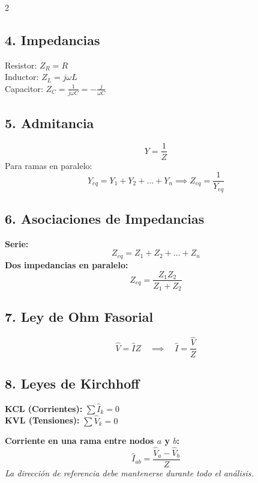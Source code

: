 \documentclass[10pt, a4paper]{article}
\begin{document}
\begin{multicols*}{2}
\subsection*{4. Impedancias}
Resistor: $\boxed{Z_R = R}$ \\
Inductor: $\boxed{Z_L = j\omega L}$ \\
Capacitor: $\boxed{Z_C = \frac{1}{j\omega C} = -\frac{j}{\omega C}}$

\subsection*{5. Admitancia}
\begin{equation*}
    \boxed{Y = \frac{1}{Z}}
\end{equation*}
Para ramas en paralelo:
\begin{equation*}
    Y_{eq} = Y_1 + Y_2 + \dots + Y_n \implies \boxed{Z_{eq} = \frac{1}{Y_{eq}}}
\end{equation*}

\subsection*{6. Asociaciones de Impedancias}
\textbf{Serie:}
\begin{equation*}
    \boxed{Z_{eq} = Z_1 + Z_2 + \dots + Z_n}
\end{equation*}
\textbf{Dos impedancias en paralelo:}
\begin{equation*}
    \boxed{Z_{eq} = \frac{Z_1 Z_2}{Z_1 + Z_2}}
\end{equation*}

\subsection*{7. Ley de Ohm Fasorial}
\begin{equation*}
    \boxed{\hat{V} = \hat{I} Z} \quad \implies \quad \boxed{\hat{I} = \frac{\hat{V}}{Z}}
\end{equation*}

\subsection*{8. Leyes de Kirchhoff}
\textbf{KCL (Corrientes):} $\boxed{\sum \hat{I}_k = 0}$ \\
\textbf{KVL (Tensiones):} $\boxed{\sum \hat{V}_k = 0}$

\vspace{0.2cm}
\textbf{Corriente en una rama entre nodos $a$ y $b$:}
\begin{equation*}
    \boxed{\hat{I}_{ab} = \frac{\hat{V}_a - \hat{V}_b}{Z}}
\end{equation*}
\textit{La dirección de referencia debe mantenerse durante todo el análisis.}


\end{multicols*}
\end{document}
